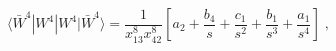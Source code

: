 \begin{equation}\label{8''}
  \langle \bar W^4| W^4|W^4|\bar W^4 \rangle =  \frac{1}{x^8_{13}x^8_{42}} \left[a_2 +  \frac{b_4}{s}  + \frac{c_1}{s^2}   + \frac{b_1}{s^3} + \frac{a_1}{s^4}   \right] \;,
\end{equation} 
